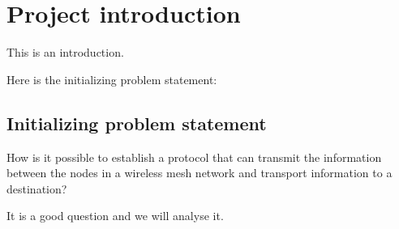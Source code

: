 \chapter{Project introduction}
This is an introduction.

Here is the initializing problem statement:

\section{Initializing problem statement}
How is it possible to establish a protocol that can transmit the information between the nodes in a wireless mesh network and transport information to a destination?

It is a good question and we will analyse it.